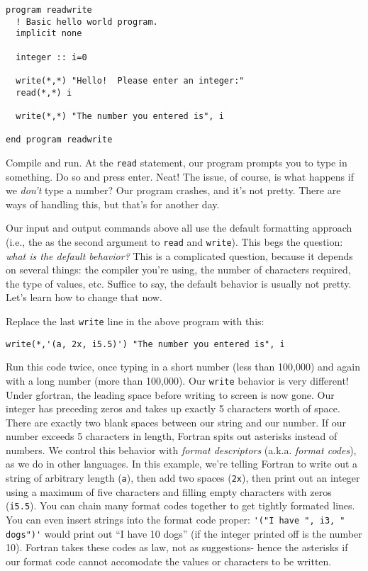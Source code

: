 \documentclass[11pt, letterpaper]{article}
\begin{document}
\begin{verbatim}
program readwrite
  ! Basic hello world program.
  implicit none
  
  integer :: i=0
  
  write(*,*) "Hello!  Please enter an integer:"
  read(*,*) i

  write(*,*) "The number you entered is", i

end program readwrite
\end{verbatim}

Compile and run.  At the {\tt read} statement, our program prompts you to type
in something.  Do so and press enter.  Neat!  The issue, of course, is what
happens if we \emph{don't} type a number?  Our program crashes, and it's not
pretty.  There are ways of handling this, but that's for another day.

Our input and output commands above all use the default formatting approach
(i.e., the {\tt *} as the second argument to {\tt read} and {\tt write}).  This
begs the question: \emph{what is the default behavior?}  This is a complicated
question, because it depends on several things: the compiler you're using, the
number of characters required, the type of values, etc.  Suffice to say, the
default behavior is usually not pretty.  Let's learn how to change that now.

Replace the last {\tt write} line in the above program with this:

\begin{verbatim}
write(*,'(a, 2x, i5.5)') "The number you entered is", i
\end{verbatim}

Run this code twice, once typing in a short number (less than 100,000) and again
with a long number (more than 100,000).
Our {\tt write} behavior is very different!  Under gfortran, the leading space
before writing to screen is now gone.  Our integer has preceding zeros and takes
up exactly 5 characters worth of space.  There are exactly two blank spaces
between our string and our number.  If our number exceeds 5 characters in
length, Fortran spits out asterisks instead of numbers.
We control this behavior with \emph{format descriptors}
(a.k.a. \emph{format codes}), as we do in other languages.
In this example, we're telling Fortran to write out a string of arbitrary
length ({\tt a}), then add two spaces ({\tt 2x}), then print out an
integer using a maximum of five characters and filling empty characters with
zeros ({\tt i5.5}).  You can chain many format codes together to
get tightly formated lines.  You can even insert strings into the format
code proper: \verb_'("I have ", i3, " dogs")'_ would print out
``I have  10 dogs'' (if the integer printed off is the number 10).
Fortran takes these codes as law, not as suggestions- hence the asterisks if
our format code cannot accomodate the values or characters to be written.
\end{document}

